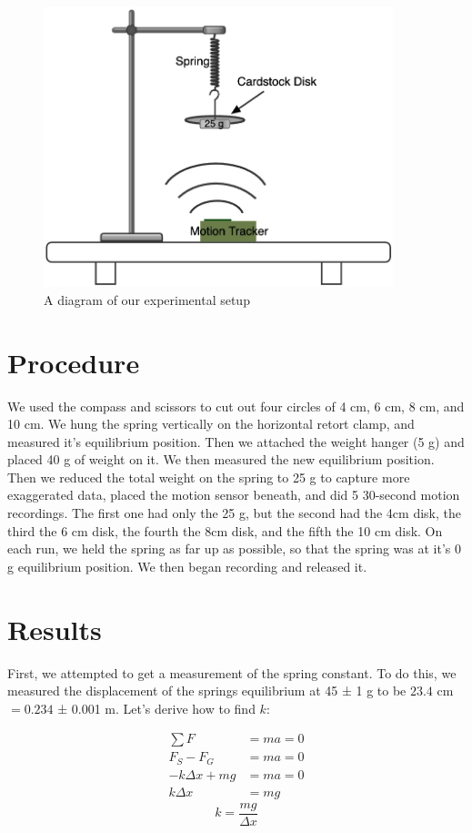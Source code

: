 \documentclass[12pt,letterpaper]{article}
\begin{document}
 \begin{figure}[ht]
     \centering
     \includegraphics[width=4in]{images/setup.png}
     \caption{A diagram of our experimental setup}
     \label{fig:setup}
 \end{figure}

\section{Procedure}

 We used the compass and scissors to cut out four circles of 4 cm, 6 cm, 8 cm, and 10 cm. We hung the spring vertically on the horizontal retort clamp, and measured it's equilibrium position. Then we attached the weight hanger (5 g) and placed 40 g of weight on it. We then measured the new equilibrium position. Then we reduced the total weight on the spring to 25 g to capture more exaggerated data, placed the motion sensor beneath, and did 5 30-second motion recordings. The first one had only the 25 g, but the second had the 4cm disk, the third the 6 cm disk, the fourth the 8cm disk, and the fifth the 10 cm disk. On each run, we held the spring as far up as possible, so that the spring was at it's 0 g equilibrium position. We then began recording and released it.

\section{Results}

First, we attempted to get a measurement of the spring constant. To do this, we measured the displacement of the springs equilibrium at 45 ± 1 g to be $23.4$ cm $=0.234$ ± 0.001 m. Let's derive how to find $k$:

\begin{align*}
    \sum F&=ma = 0 \\
    F_S-F_G&=ma = 0 \\
    -k\Delta x+mg&=ma = 0 \\
    k\Delta x&=mg
\end{align*}
\begin{equation}
    k=\frac{mg}{\Delta x}
\end{equation}
\end{document}
